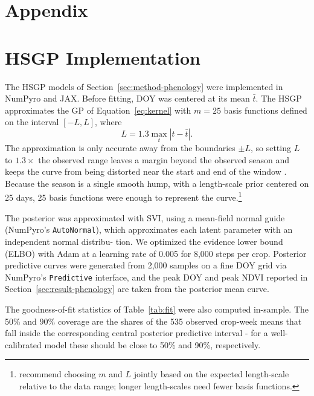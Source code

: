 \documentclass[10pt,letterpaper]{article}
\begin{document}
\FloatBarrier
\begingroup\raggedright


\endgroup
\clearpage
\appendix
\section*{Appendix}
\section{HSGP Implementation}\label{app:hsgp}
The HSGP models of Section~\ref{sec:method-phenology} were implemented in NumPyro and JAX. Before fitting, DOY was centered at its mean $\bar{t}$. The HSGP approximates the GP of Equation~\ref{eq:kernel} with $m=25$ basis functions defined on the interval $[-L,L]$, where
\begin{equation}
L=1.3\max_t|t-\bar{t}|.
\label{eq:boundary}
\end{equation}
The approximation is only accurate away from the boundaries $\pm L$, so setting $L$ to $1.3\times$ the observed range leaves a margin beyond the observed season and keeps the curve from being distorted near the start and end of the window \citep{riutort2023hsgp}. Because the season is a single smooth hump, with a length-scale prior centered on 25 days, 25 basis functions were enough to represent the curve.\footnote{\citet{riutort2023hsgp} recommend choosing $m$ and $L$ jointly based on the expected length-scale relative to the data range; longer length-scales need fewer basis functions.}

The posterior was approximated with SVI, using a mean-field normal guide (NumPyro's \texttt{AutoNormal}), which approximates each latent parameter with an independent normal distribu- tion. We optimized the evidence lower bound (ELBO) with Adam at a learning rate of 0.005 for 8,000 steps per crop. Posterior predictive curves were generated from 2,000 samples on a fine DOY grid via NumPyro's \texttt{Predictive} interface, and the peak DOY and peak NDVI reported in Section~\ref{sec:result-phenology} are taken from the posterior mean curve.

The goodness-of-fit statistics of Table~\ref{tab:fit} were also computed in-sample. The 50\% and 90\% coverage are the shares of the 535 observed crop-week means that fall inside the corresponding central posterior predictive interval - for a well-calibrated model these should be close to 50\% and 90\%, respectively.
\end{document}
